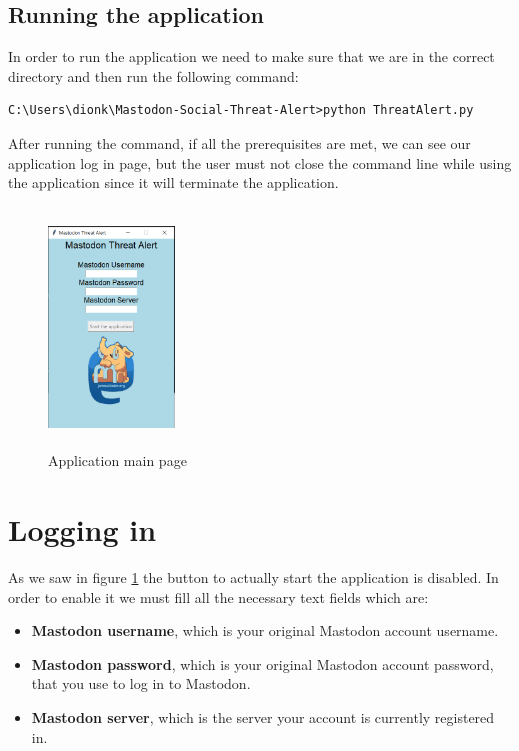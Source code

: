 \subsection{Running the application}
\label{ss:running_app}
In order to run the application we need to make sure that
we are in the correct directory and then run the following command:
\\[5pt]
\begin{lstlisting}[caption=Running the application, captionpos=b]
	C:\Users\dionk\Mastodon-Social-Threat-Alert>python ThreatAlert.py 
\end{lstlisting}

After running the command, if all the prerequisites are met, we can see 
our application log in page, but the user must not close the command line while using the application since it will terminate the application.
\begin{figure}[H]
	\centering
	\includegraphics[width=0.3\textwidth,height=240px]{images/mainpageapp.png}
	\caption{Application main page}
	\label{fig:empty_page}
\end{figure}

\section{Logging in}
\label{s:Logging_in}
As we saw in figure \ref{fig:empty_page} the button to actually start the application is disabled.
In order to enable it we must fill all the necessary text fields which are:
\begin{itemize}
	\item \textbf{Mastodon username}, which is your original Mastodon account username.
	\item \textbf{Mastodon password}, which is your original Mastodon account password, that you use to log in to Mastodon.
	\item \textbf{Mastodon server}, which is the server your account is currently registered in.
\end{itemize}


